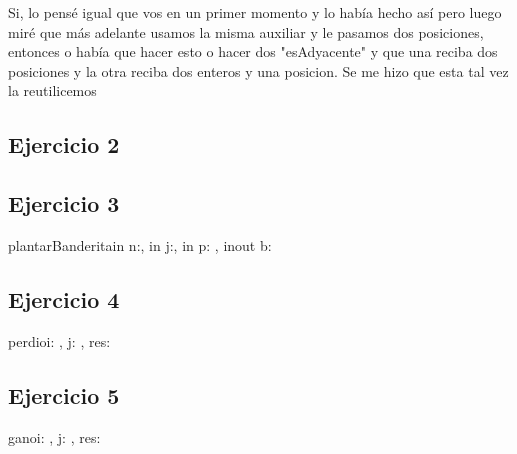\documentclass[a4paper]{article}
\begin{document}
{\color{red} Si, lo pensé igual que vos en un primer momento y lo había hecho así pero luego miré que más adelante usamos la misma auxiliar y le pasamos dos posiciones, entonces o había que hacer esto o hacer dos  "esAdyacente" y que una reciba dos posiciones y la otra reciba dos enteros y una posicion. Se me hizo que esta tal vez la reutilicemos}

\subsection*{Ejercicio 2}
 {}

\subsection*{Ejercicio 3}

\begin{proc}{plantarBanderita}{in n:\ent, in j:\jugadas, in p: \pos, inout b: \banderitas}{}
\end{proc}

\subsection*{Ejercicio 4}

\begin{proc}{perdio}{\In i: \tablero, \In j: \jugadas, \Out res: \bool}{}
\end{proc}



\subsection*{Ejercicio 5}
\begin{proc}{gano}{\In i: \tablero, \In j: \jugadas, \Out res: \bool}{}
\end{proc}
\end{document}
